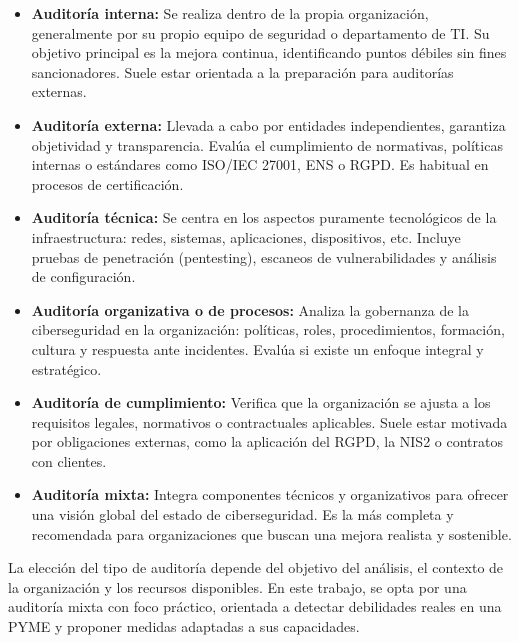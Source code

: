 \documentclass[a4paper, 11pt]{article}
\begin{document}
\begin{itemize}
    \item \textbf{Auditoría interna:} Se realiza dentro de la propia organización, generalmente por su propio equipo de seguridad o departamento de TI. Su objetivo principal es la mejora continua, identificando puntos débiles sin fines sancionadores. Suele estar orientada a la preparación para auditorías externas.

    \item \textbf{Auditoría externa:} Llevada a cabo por entidades independientes, garantiza objetividad y transparencia. Evalúa el cumplimiento de normativas, políticas internas o estándares como ISO/IEC 27001, ENS o RGPD. Es habitual en procesos de certificación.

    \item \textbf{Auditoría técnica:} Se centra en los aspectos puramente tecnológicos de la infraestructura: redes, sistemas, aplicaciones, dispositivos, etc. Incluye pruebas de penetración (pentesting), escaneos de vulnerabilidades y análisis de configuración.

    \item \textbf{Auditoría organizativa o de procesos:} Analiza la gobernanza de la ciberseguridad en la organización: políticas, roles, procedimientos, formación, cultura y respuesta ante incidentes. Evalúa si existe un enfoque integral y estratégico.

    \item \textbf{Auditoría de cumplimiento:} Verifica que la organización se ajusta a los requisitos legales, normativos o contractuales aplicables. Suele estar motivada por obligaciones externas, como la aplicación del RGPD, la NIS2 o contratos con clientes.

    \item \textbf{Auditoría mixta:} Integra componentes técnicos y organizativos para ofrecer una visión global del estado de ciberseguridad. Es la más completa y recomendada para organizaciones que buscan una mejora realista y sostenible.
\end{itemize}

La elección del tipo de auditoría depende del objetivo del análisis, el contexto de la organización y los recursos disponibles. En este trabajo, se opta por una auditoría mixta con foco práctico, orientada a detectar debilidades reales en una PYME y proponer medidas adaptadas a sus capacidades.
\end{document}
